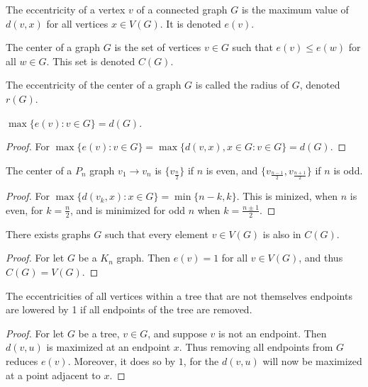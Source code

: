         \begin{definition}
        The eccentricity of a vertex $v$ of a connected graph $G$ is the maximum value of $d(v,x)$ for all vertices $x\in V(G)$. It is denoted $e(v)$.
        \end{definition}
        \begin{definition}
        The center of a graph $G$ is the set of vertices $v\in G$ such that $e(v) \leq e(w)$ for all $w\in G$. This set is denoted $C(G)$.
        \end{definition}
        \begin{definition}
        The eccentricity of the center of a graph $G$ is called the radius of $G$, denoted $r(G)$.
        \end{definition}
        \begin{theorem}
        $\max\{e(v):v\in G\}= d(G)$.
        \end{theorem}
        \begin{proof}
        For $\max\{e(v):v\in G\} = \max\{d(v,x), x\in G:v\in G\} = d(G)$.
        \end{proof}
        \begin{theorem}
        The center of a $P_n$ graph $v_1\rightarrow v_n$ is $\{v_\frac{n}{2}\}$ if $n$ is even, and $\{v_{\frac{n-1}{2}},v_{\frac{n+1}{2}}\}$ if $n$ is odd.
        \end{theorem}
        \begin{proof}
        For $\max\{d(v_k,x):x\in G\} = \min\{n-k,k\}$. This is minized, when $n$ is even, for $k= \frac{n}{2}$, and is minimized for odd $n$ when $k=\frac{n\pm 1}{2}$.
        \end{proof}
        \begin{theorem}
        There exists graphs $G$ such that every element $v\in V(G)$ is also in $C(G)$.
        \end{theorem}
        \begin{proof}
        For let $G$ be a $K_n$ graph. Then $e(v) = 1$ for all $v\in V(G)$, and thus $C(G) = V(G)$.
        \end{proof}
        \begin{theorem}
        The eccentricities of all vertices within a tree that are not themselves endpoints are lowered by 1 if all endpoints of the tree are removed.
        \end{theorem}
        \begin{proof}
        For let $G$ be a tree, $v\in G$, and suppose $v$ is not an endpoint. Then $d(v,u)$ is maximized at an endpoint $x$. Thus removing all endpoints from $G$ reduces $e(v)$. Moreover, it does so by $1$, for the $d(v,u)$ will now be maximized at a point adjacent to $x$.
        \end{proof}
